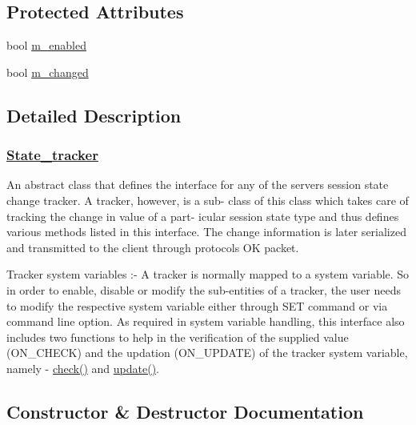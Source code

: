 \subsection*{Protected Attributes}
\begin{DoxyCompactItemize}
\item 
bool \mbox{\hyperlink{classState__tracker_a95fd0969d9f32c8daeddfbe1848b2da3}{m\+\_\+enabled}}
\item 
bool \mbox{\hyperlink{classState__tracker_a398c00ac9a343c4a7b39836708054383}{m\+\_\+changed}}
\end{DoxyCompactItemize}


\subsection{Detailed Description}
\subsubsection*{\mbox{\hyperlink{classState__tracker}{State\+\_\+tracker}} }

An abstract class that defines the interface for any of the server\textquotesingle{}s \textquotesingle{}session state change tracker\textquotesingle{}. A tracker, however, is a sub-\/ class of this class which takes care of tracking the change in value of a part-\/ icular session state type and thus defines various methods listed in this interface. The change information is later serialized and transmitted to the client through protocol\textquotesingle{}s OK packet.

Tracker system variables \+:-\/ A tracker is normally mapped to a system variable. So in order to enable, disable or modify the sub-\/entities of a tracker, the user needs to modify the respective system variable either through S\+ET command or via command line option. As required in system variable handling, this interface also includes two functions to help in the verification of the supplied value (O\+N\+\_\+\+C\+H\+E\+CK) and the updation (O\+N\+\_\+\+U\+P\+D\+A\+TE) of the tracker system variable, namely -\/ \mbox{\hyperlink{classState__tracker_a50923266a6300e657b70dc4f0125782c}{check()}} and \mbox{\hyperlink{classState__tracker_a74ffdcb79733e8d31e9fe2dcae346022}{update()}}. 

\subsection{Constructor \& Destructor Documentation}
\mbox{\label{classState__tracker_a571c37e501f7cfde9b4b8302d5d91cd8}} 
